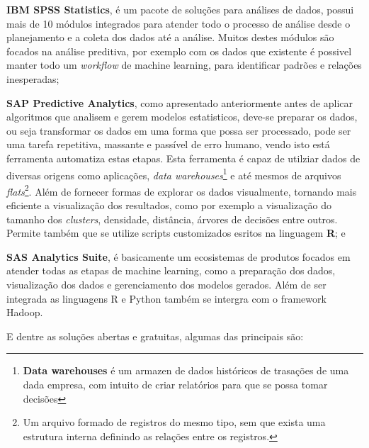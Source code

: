 \begin{alineas}
	\item \textbf{IBM SPSS Statistics}, é um pacote de soluções para análises de dados, possui mais de 10 módulos integrados para 
	atender todo o processo de análise desde o planejamento e a coleta dos dados até a análise. Muitos destes módulos são focados na análise
	preditiva, por exemplo com os dados que existente é possivel manter todo um \textit{workflow} de machine learning, para identificar padrões e relações 
	inesperadas;

	\item \textbf{SAP Predictive Analytics}, como apresentado anteriormente antes de aplicar algoritmos que analisem e gerem modelos estatisticos, deve-se 
	preparar os dados, ou seja transformar os dados em uma forma que possa ser processado, pode ser uma tarefa repetitiva, massante e passível de erro humano, 
	vendo isto está ferramenta automatiza estas etapas. Esta ferramenta é capaz de utilziar dados de diversas origens como aplicações, 
	\textit{data warehouses}\footnote{\textbf{Data warehouses} é um armazen de dados históricos de trasações de uma dada empresa, com intuito de criar relatórios para que
	se possa tomar decisões} e até mesmos de arquivos \textit{flats}\footnote{Um arquivo formado de registros do mesmo tipo, sem que 
	exista uma estrutura interna definindo as relações entre os registros.}. 
	Além de fornecer formas de explorar os dados visualmente, tornando mais eficiente a visualização dos resultados, como por exemplo a visualização 
	do tamanho dos \textit{clusters}, densidade, distância, árvores de decisões entre outros. Permite também que se utilize scripts customizados 
	esritos na linguagem \textbf{R}; e

	\item \textbf{SAS Analytics Suite}, é basicamente um ecosistemas de produtos focados em atender todas as etapas de machine learning, como a preparação
	dos dados, visualização dos dados e gerenciamento dos modelos gerados. Além de ser integrada as linguagens R e Python também se intergra com o framework
	Hadoop.	
\end{alineas}

E dentre as soluções abertas e gratuitas, algumas das principais são:

